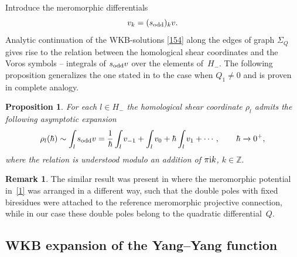 \documentclass[pdftex]{sigma}
\numberwithin{equation}{section}
\newtheorem{Proposition}[Theorem]{Proposition}
\theoremstyle{definition}
\newtheorem{Remark}[Theorem]{Remark}
\newcommand{\Z}{\mathbb{Z}}
\begin{document}
Introduce the meromorphic differentials
\begin{equation*}%
v_k=(s_{\rm odd})_kv.
\end{equation*}
Analytic continuation of the WKB-solutions \eqref{154} along the edges of graph $\Sigma_Q$ gives rise to the relation between the homological shear coordinates and the Voros symbols -- integrals of $s_{\rm odd}v$ over the elements of~$H_{-}.$ The following proposition generalizes the one stated in \cite{bertola2021wkb} to the case when $Q_1 \neq 0$ and is proven in complete analogy.
\begin{Proposition}
For each $l \in H_-$ the homological shear coordinate $\rho_l$ admits the following asymptotic expansion
\begin{equation}\label{157}
 \rho_{l}(\hbar) \sim \int_l s_{\rm odd}v=\frac{1}{\hbar}\int_l v_{-1}+ \int_l v_0 + \hbar \int_l v_1 +\cdots, \qquad \hbar \xrightarrow[]{} 0^+,
 \end{equation}
 where the relation is understood modulo an addition of $ \pi{\rm i} k$, $k \in \Z.$
\end{Proposition}

\begin{Remark}The similar result was present in \cite{voros_alegr} where the meromorphic potential in~\eqref{1} was arranged in a different way, such that the double poles with fixed biresidues were attached to the reference meromorphic projective connection, while in our case these double poles belong to the quadratic differential~$Q$.
\end{Remark}

\subsection{WKB expansion of the Yang--Yang function}
\end{document}
